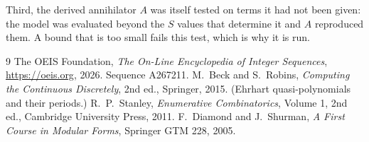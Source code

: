 \documentclass[11pt,a4paper]{article}
\theoremstyle{plain}
\theoremstyle{definition}
\begin{document}
Third, the derived annihilator $A$ was itself tested on terms it had not been given: the model
was evaluated beyond the $S$ values that determine it and $A$ reproduced them. A bound that is
too small fails this test, which is why it is run.

\begin{thebibliography}{9}
 The OEIS Foundation, \emph{The On-Line Encyclopedia of Integer
Sequences}, \url{https://oeis.org}, 2026. Sequence A267211.
 M.~Beck and S.~Robins, \emph{Computing the Continuous Discretely},
2nd ed., Springer, 2015. (Ehrhart quasi-polynomials and their periods.)
 R.~P.~Stanley, \emph{Enumerative Combinatorics}, Volume 1, 2nd ed.,
Cambridge University Press, 2011.
 F.~Diamond and J.~Shurman, \emph{A First Course in Modular Forms},
Springer GTM 228, 2005.
\end{thebibliography}
\end{document}
